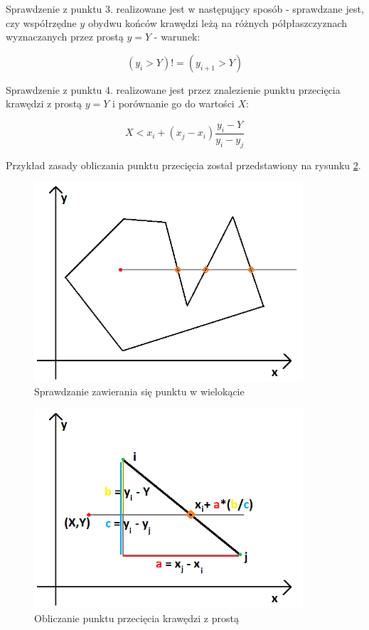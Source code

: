 \documentclass{article}
\begin{document}
Sprawdzenie z punktu 3. realizowane jest w następujący sposób - sprawdzane jest, czy współrzędne \(y\) obydwu końców krawędzi leżą na różnych półpłaszczyznach wyznaczanych przez prostą \(y=Y\) - warunek:

$$(y_i > Y) != (y_{i+1} > Y)$$

Sprawdzenie z punktu 4. realizowane jest przez znalezienie punktu przecięcia krawędzi z prostą \(y=Y\) i porównanie go do wartości \(X\):

$$X < x_i + (x_j - x_i)\frac{y_i - Y}{y_i - y_j}$$

Przykład zasady obliczania punktu przecięcia został przedstawiony na rysunku \ref{fig:przeciecie}.

\begin{figure}[H]
    \centering
    \includegraphics[width=10cm]{zawieranie.png}
    \caption{Sprawdzanie zawierania się punktu w wielokącie}
    \label{fig:zawieranie}
\end{figure}

\begin{figure}[H]
    \centering
    \includegraphics[width=10cm]{przeciecie.png}
    \caption{Obliczanie punktu przecięcia krawędzi z prostą}
    \label{fig:przeciecie}
\end{figure}
\end{document}
